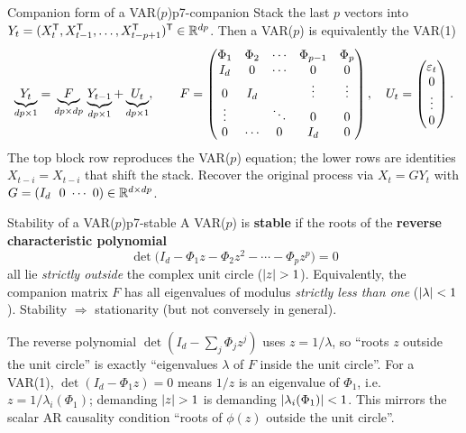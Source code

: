 \begin{definition}{Companion form of a VAR($p$)}{p7-companion}
Stack the last $p$ vectors into $Y_t=(X_t^{\mathsf{T}},X_{t-1}^{\mathsf{T}},\dots,X_{t-p+1}^{\mathsf{T}})^{\mathsf{T}}
\in\mathbb{R}^{dp}$. Then a VAR($p$) is equivalently the VAR(1)
\[
\underbrace{Y_t}_{dp\times1}
=\underbrace{F}_{dp\times dp}\,\underbrace{Y_{t-1}}_{dp\times1}
+\underbrace{U_t}_{dp\times1},
\qquad
F=\begin{pmatrix}
\Phi_1 & \Phi_2 & \cdots & \Phi_{p-1} & \Phi_p\\
I_d & 0 & \cdots & 0 & 0\\
0 & I_d & & \vdots & \vdots\\
\vdots & & \ddots & 0 & 0\\
0 & \cdots & 0 & I_d & 0
\end{pmatrix},
\quad
U_t=\begin{pmatrix}\varepsilon_t\\0\\\vdots\\0\end{pmatrix}.
\]
The top block row reproduces the VAR($p$) equation; the lower rows are
identities $X_{t-i}=X_{t-i}$ that shift the stack. Recover the original process
via $X_t=G Y_t$ with $G=(I_d\ \ 0\ \cdots\ 0)\in\Reals^{d\times dp}$.
\end{definition}

\begin{definition}{Stability of a VAR($p$)}{p7-stable}
A VAR($p$) is \textbf{stable} if the roots of the \textbf{reverse
characteristic polynomial}
\[
\det\!\big(I_d-\Phi_1 z-\Phi_2 z^2-\cdots-\Phi_p z^p\big)=0
\]
all lie \emph{strictly outside} the complex unit circle ($\left\lvert z \right\rvert>1$).
Equivalently, the companion matrix $F$ has all eigenvalues of modulus
\emph{strictly less than one} ($\left\lvert \lambda \right\rvert<1$). Stability $\Rightarrow$
stationarity (but not conversely in general).
\end{definition}

\begin{intuition}
The reverse polynomial $\det(I_d-\sum_j\Phi_j z^j)$ uses $z=1/\lambda$, so
``roots $z$ outside the unit circle'' is exactly ``eigenvalues $\lambda$ of $F$
inside the unit circle''. For a VAR(1), $\det(I_d-\Phi_1 z)=0$ means $1/z$ is an
eigenvalue of $\Phi_1$, i.e.\ $z=1/\lambda_i(\Phi_1)$; demanding $\left\lvert z \right\rvert>1$ is
demanding $\left\lvert \lambda_i(\Phi_1) \right\rvert<1$. This mirrors the scalar AR causality
condition ``roots of $\phi(z)$ outside the unit circle''.
\end{intuition}


